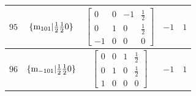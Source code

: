 \documentclass[fleqn,8pt]{jsarticle}
\begin{document}
\begin{longtable}{ccccc}
$ 95 $ & $ \{{\rm m}_{101}|\frac{1}{2} \frac{1}{2} 0\} $ & $ \begin{bmatrix} 0 & 0 & -1 & \frac{1}{2} \\ 0 & 1 & 0 & \frac{1}{2} \\ -1 & 0 & 0 & 0 \end{bmatrix} $ & $ -1 $ & $ 1 $ \\ \hline
$ 96 $ & $ \{{\rm m}_{-101}|\frac{1}{2} \frac{1}{2} 0\} $ & $ \begin{bmatrix} 0 & 0 & 1 & \frac{1}{2} \\ 0 & 1 & 0 & \frac{1}{2} \\ 1 & 0 & 0 & 0 \end{bmatrix} $ & $ -1 $ & $ 1 $ \\
\end{longtable}
\end{document}
